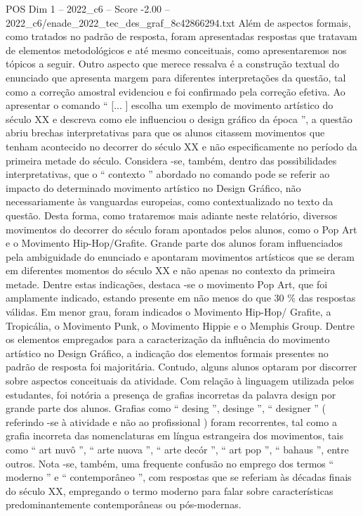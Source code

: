 \begin{textsample}{POS Dim 1 – 2022\_c6 – Score -2.00 – 2022\_c6/enade\_2022\_tec\_des\_graf\_8c42866294.txt}
Além de aspectos formais, como tratados no padrão de resposta, foram apresentadas respostas que tratavam de elementos metodológicos e até mesmo conceituais, como apresentaremos nos tópicos a seguir.
Outro aspecto que merece ressalva é a construção textual do enunciado que apresenta margem para diferentes interpretações da questão, tal como a correção amostral evidenciou e foi confirmado pela correção efetiva.
Ao apresentar o comando “ [... ] escolha um exemplo de movimento artístico do século XX e descreva como ele influenciou o design gráfico da época ”, a questão abriu brechas interpretativas para que os alunos citassem movimentos que tenham acontecido no decorrer do século XX e não especificamente no período da primeira metade do século.
Considera -se, também, dentro das possibilidades interpretativas, que o “ contexto ” abordado no comando pode se referir ao impacto do determinado movimento artístico no Design Gráfico, não necessariamente às vanguardas europeias, como contextualizado no texto da questão.
Desta forma, como trataremos mais adiante neste relatório, diversos movimentos do decorrer do século foram apontados pelos alunos, como o Pop Art e o Movimento Hip-Hop/Grafite.
Grande parte dos alunos foram influenciados pela ambiguidade do enunciado e apontaram movimentos artísticos que se deram em diferentes momentos do século XX e não apenas no contexto da primeira metade.
Dentre estas indicações, destaca -se o movimento Pop Art, que foi amplamente indicado, estando presente em não menos do que 30 \% das respostas válidas.
Em menor grau, foram indicados o Movimento Hip-Hop/ Grafite, a Tropicália, o Movimento Punk, o Movimento Hippie e o Memphis Group.
Dentre os elementos empregados para a caracterização da influência do movimento artístico no Design Gráfico, a indicação dos elementos formais presentes no padrão de resposta foi majoritária.
Contudo, alguns alunos optaram por discorrer sobre aspectos conceituais da atividade.
Com relação à linguagem utilizada pelos estudantes, foi notória a presença de grafias incorretas da palavra design por grande parte dos alunos.
Grafias como “ desing ”, desinge ”, “ designer ” ( referindo -se à atividade e não ao profissional ) foram recorrentes, tal como a grafia incorreta das nomenclaturas em língua estrangeira dos movimentos, tais como “ art nuvô ”, “ arte nuova ”, “ arte decór ”, “ art pop ”, “ bahaus ”, entre outros.
Nota -se, também, uma frequente confusão no emprego dos termos “ moderno ” e “ contemporâneo ”, com respostas que se referiam às décadas finais do século XX, empregando o termo moderno para falar sobre características predominantemente contemporâneas ou pós-modernas.

\end{textsample}
